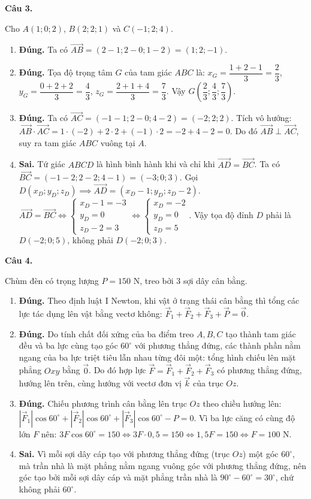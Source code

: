 \documentclass[12pt,a4paper]{article}
\newcommand{\loigiai}[1]{\par\medskip\Needspace{4\baselineskip}\noindent\textbf{#1}\par\nobreak}
\begin{document}
\loigiai{Câu 3.}
Cho $A(1;0;2)$, $B(2;2;1)$ và $C(-1;2;4)$.
\begin{enumerate}
\item \textbf{Đúng.} Ta có $\vec{AB}=(2-1; 2-0; 1-2)=(1;2;-1)$.
\item \textbf{Đúng.} Tọa độ trọng tâm $G$ của tam giác $ABC$ là:
$x_G=\dfrac{1+2-1}{3}=\dfrac{2}{3}$, $y_G=\dfrac{0+2+2}{3}=\dfrac{4}{3}$, $z_G=\dfrac{2+1+4}{3}=\dfrac{7}{3}$.
Vậy $G\left(\dfrac{2}{3};\dfrac{4}{3};\dfrac{7}{3}\right)$.
\item \textbf{Đúng.} Ta có $\vec{AC}=(-1-1; 2-0; 4-2)=(-2;2;2)$.
Tích vô hướng: $\vec{AB}\cdot\vec{AC}=1\cdot(-2)+2\cdot 2+(-1)\cdot 2=-2+4-2=0$.
Do đó $\vec{AB}\perp\vec{AC}$, suy ra tam giác $ABC$ vuông tại $A$.
\item \textbf{Sai.} Tứ giác $ABCD$ là hình bình hành khi và chỉ khi $\vec{AD}=\vec{BC}$.
Ta có $\vec{BC}=(-1-2; 2-2; 4-1)=(-3;0;3)$.
Gọi $D(x_D;y_D;z_D) \implies \vec{AD}=(x_D-1; y_D; z_D-2)$.
$\vec{AD}=\vec{BC} \iff \begin{cases} x_D-1=-3 \\ y_D=0 \\ z_D-2=3 \end{cases} \iff \begin{cases} x_D=-2 \\ y_D=0 \\ z_D=5 \end{cases}$.
Vậy tọa độ đỉnh $D$ phải là $D(-2;0;5)$, không phải $D(-2;0;3)$.
\end{enumerate}

\loigiai{Câu 4.}
Chùm đèn có trọng lượng $P=150\text{ N}$, treo bởi 3 sợi dây cân bằng.
\begin{enumerate}
\item \textbf{Đúng.} Theo định luật I Newton, khi vật ở trạng thái cân bằng thì tổng các lực tác dụng lên vật bằng vectơ không: $\vec{F}_1+\vec{F}_2+\vec{F}_3+\vec{P}=\vec{0}$.
\item \textbf{Đúng.} Do tính chất đối xứng của ba điểm treo $A, B, C$ tạo thành tam giác đều và ba lực cùng tạo góc $60^\circ$ với phương thẳng đứng, các thành phần nằm ngang của ba lực triệt tiêu lẫn nhau từng đôi một: tổng hình chiếu lên mặt phẳng $Oxy$ bằng $\vec{0}$. Do đó hợp lực $\vec{F}=\vec{F}_1+\vec{F}_2+\vec{F}_3$ có phương thẳng đứng, hướng lên trên, cùng hướng với vectơ đơn vị $\vec{k}$ của trục $Oz$.
\item \textbf{Đúng.} Chiếu phương trình cân bằng lên trục $Oz$ theo chiều hướng lên:
$|\vec{F}_1|\cos 60^\circ + |\vec{F}_2|\cos 60^\circ + |\vec{F}_3|\cos 60^\circ - P = 0$.
Vì ba lực căng có cùng độ lớn $F$ nên:
$3F\cos 60^\circ = 150 \iff 3F\cdot 0{,}5 = 150 \iff 1{,}5 F = 150 \iff F=100\text{ N}$.
\item \textbf{Sai.} Vì mỗi sợi dây cáp tạo với phương thẳng đứng (trục $Oz$) một góc $60^\circ$, mà trần nhà là mặt phẳng nằm ngang vuông góc với phương thẳng đứng, nên góc tạo bởi mỗi sợi dây cáp và mặt phẳng trần nhà là $90^\circ - 60^\circ = 30^\circ$, chứ không phải $60^\circ$.
\end{enumerate}
\end{document}
